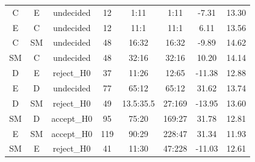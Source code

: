 \begin{table}[htbp]
\begin{tabular}{cccccccc}
        C  & E  & undecided & 12 & 1:11      & 1:11      & -7.31  & 13.30 \\
        E  & C  & undecided & 12 & 11:1      & 11:1      & 6.11   & 13.56 \\
        C  & SM & undecided & 48 & 16:32     & 16:32     & -9.89  & 14.62 \\
        SM & C  & undecided & 48 & 32:16     & 32:16     & 10.20  & 14.14 \\
        D  & E  & reject\_H0 & 37 & 11:26     & 12:65     & -11.38 & 12.88 \\
        E  & D  & undecided & 77 & 65:12     & 65:12     & 31.62  & 13.74 \\
        D  & SM & reject\_H0 & 49 & 13.5:35.5 & 27:169    & -13.95 & 13.60 \\
        SM & D  & accept\_H0 & 95 & 75:20     & 169:27    & 31.78  & 12.81 \\
        E  & SM & accept\_H0 & 119 & 90:29    & 228:47    & 31.34  & 11.93 \\
        SM & E  & reject\_H0 & 41 & 11:30     & 47:228    & -11.03 & 12.61 \\
        \hline
    \end{tabular}
\end{table}